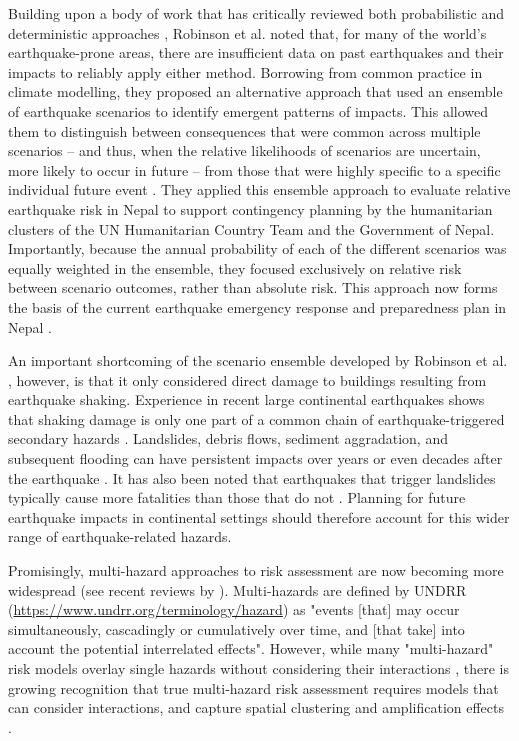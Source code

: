 \documentclass[preprint,12pt,authoryear]{elsarticle}
\begin{document}
Building upon a body of work that has critically reviewed both probabilistic and deterministic approaches \citep{Bommer2002,Wang2003,Wang2011,Bilham2013, klugel_seismic_2008}, Robinson et al. \citep{Robinson2018} noted that, for many of the world's earthquake-prone areas, there are insufficient data on past earthquakes and their impacts to reliably apply either method. Borrowing from common practice in climate modelling, they proposed an alternative approach that used an ensemble of earthquake scenarios to identify emergent patterns of impacts. This allowed them to distinguish between consequences that were common across multiple scenarios -- and thus, when the relative likelihoods of scenarios are uncertain,  more likely to occur in future -- from those that were highly specific to a specific individual future event \citep{Robinson2018}. They applied this ensemble approach to evaluate relative earthquake risk in Nepal to support contingency planning by the humanitarian clusters of the UN Humanitarian Country Team and the Government of Nepal. Importantly, because the annual probability of each of the different scenarios was equally weighted in the ensemble, they focused exclusively on relative risk between scenario outcomes, rather than absolute risk. This approach now forms the basis of the current earthquake emergency response and preparedness plan in Nepal \citep{un_nepal2022earthquake}.

An important shortcoming of the scenario ensemble developed by Robinson et al. \citep{Robinson2018}, however, is that it only considered direct damage to buildings resulting from earthquake shaking. Experience in recent large continental earthquakes shows that shaking damage is only one part of a common chain of earthquake-triggered secondary hazards \citep{Gill2014}. Landslides, debris flows, sediment aggradation, and subsequent flooding can have persistent impacts over years or even decades after the earthquake \citep{Fan2019,Kincey2021, francis_fate_2022}. It has also been noted that earthquakes that trigger landslides typically cause more fatalities than those that do not \citep{Budimir2014}. Planning for future earthquake impacts in continental settings should therefore account for this wider range of earthquake-related hazards.

Promisingly, multi-hazard approaches to risk assessment are now becoming more widespread (see recent reviews by \cite{Gill2022,Ward2022}). Multi-hazards are defined by UNDRR (\url{https://www.undrr.org/terminology/hazard}) as "events [that] may occur simultaneously, cascadingly or cumulatively over time, and [that take] into account the potential interrelated effects". However, while many "multi-hazard" risk models overlay single hazards without considering their interactions \citep{Gill2014}, there is growing recognition that true multi-hazard risk assessment requires models that can consider interactions, and capture spatial clustering and  amplification effects \citep{Mignan2014,Tilloy2019,Dunant2021,Ming2022,Hochrainer-Stigler2023}.
\end{document}

